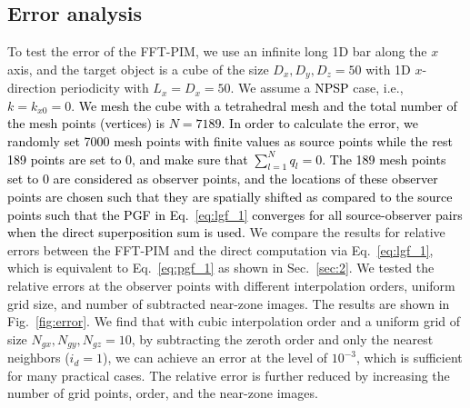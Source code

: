 \documentclass{article}
\begin{document}
\subsection{Error analysis} \label{ssec:4.1}
To test the error of the FFT-PIM, we use an infinite long 1D bar along the $x$ axis, and the target object is a cube of the size $D_x,D_y,D_z=50$ with 1D $x$-direction periodicity with $L_x=D_x=50$. We assume a \textcolor{black}{NPSP} case, i.e., $k=k_{x0}=0$. \textcolor{black}{We mesh the cube with a tetrahedral mesh and the total number of the mesh points (vertices) is $N=7189$. In order to calculate the error, we randomly set 7000 mesh points with finite values as source points while the rest 189 points are set to $0$, and make sure that $\sum_{l=1}^N q_l = 0$. The 189 mesh points set to $0$ are considered as observer points, and the locations of these observer points are chosen such that they are spatially shifted as compared to the source points such that the PGF in Eq.~\eqref{eq:lgf_1} converges for all source-observer pairs when the direct superposition sum is used.} We compare the results for relative errors between the FFT-PIM and the direct computation via Eq.~\eqref{eq:lgf_1}, which is equivalent to Eq.~\eqref{eq:pgf_1} as shown in Sec.~\ref{sec:2}. We tested the relative errors at the observer points with different interpolation orders, uniform grid size, and number of subtracted near-zone images. The results are shown in Fig.~\ref{fig:error}. We find that with cubic interpolation order and a uniform grid of size $N_{gx},N_{gy},N_{gz}=10$, by subtracting the zeroth order and only the nearest neighbors ($i_d = 1$), we can achieve an error at the level of $10^{-3}$, which is sufficient for many practical cases. The relative error is further reduced by increasing the number of grid points, order, and the near-zone images.
\end{document}

